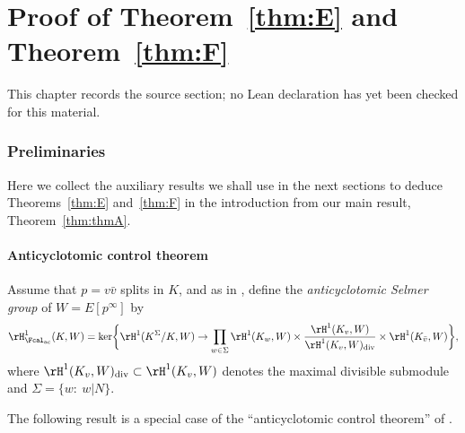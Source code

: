\chapter{Proof of Theorem~\ref{thm:E} and Theorem~\ref{thm:F}}
\label{anticyclotomic-iwasawa-rational-elliptic-eisenstein-chapter-06}

\begin{remark}
\label{anticyclotomic-iwasawa-rational-elliptic-eisenstein-chapter-06-source}
This chapter records the source section; no Lean declaration has yet been checked for this material.
\notready
\end{remark}

\label{sec:EF}

\subsection{Preliminaries}

Here we collect the auxiliary results we shall use in the next  sections to deduce Theorems~\ref{thm:E} and~\ref{thm:F} in the introduction from our main result, Theorem~\ref{thm:thmA}.

\subsubsection{Anticyclotomic control theorem}

Assume that $p=v\bar{v}$ splits in $K$, and as in \cite[\S{2.2.3}]{jsw}, define the \emph{anticyclotomic Selmer group} of $W=E[p^\infty]$ by
\[
\rH^1_{\Fcal_{\rm ac}}(K,W)={\rm ker}\biggl\{
\rH^1(K^\Sigma/K,W)\rightarrow\prod_{w\in \Sigma}\rH^1(K_w,W)\times\frac{\rH^1(K_v,W)}{\rH^1(K_v,W)_{\rm div}}\times\rH^1(K_{\bar{v}},W)\biggr\},
\]
where $\rH^1(K_v,W)_{\rm div}\subset\rH^1(K_v,W)$ denotes the maximal divisible submodule and $\Sigma=\{w: \ w\vert N\}$.

The following result is a special case of the ``anticyclotomic control theorem'' of \cite[\S{3}]{jsw}.


